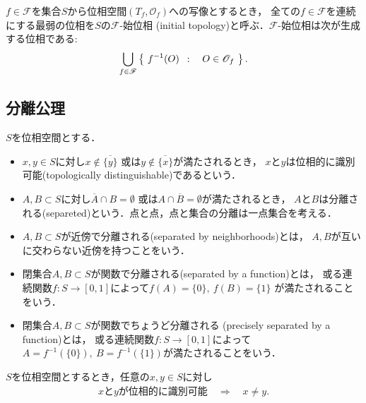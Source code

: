 	\begin{screen}
		\begin{dfn}[始位相]
			$f \in \mathscr{F}$を集合$S$から位相空間$(T_f,\mathscr{O}_f)$への写像とするとき，
			全ての$f \in \mathscr{F}$を連続にする最弱の位相を$S$の$\mathscr{F}$-始位相
			(initial topology)と呼ぶ．$\mathscr{F}$-始位相は次が生成する位相である:
			\begin{align}
				\bigcup_{f \in \mathscr{F}} \left\{\ f^{-1}(O)\ \, : \quad O \in \mathscr{O}_f\ \right\}.
			\end{align}
		\end{dfn}
	\end{screen}
	
\subsection{分離公理}
	\begin{screen}
		\begin{dfn}[位相的に識別可能・分離]
			$S$を位相空間とする．
			\begin{itemize}
				\item $x,y \in S$に対し$x \notin \overline{\{y\}}$
					或は$y \notin \overline{\{x\}}$が満たされるとき，
					$x$と$y$は位相的に識別可能(topologically distinguishable)であるという．
				\item $A,B \subset S$に対し$\overline{A} \cap B = \emptyset$
					或は$A \cap \overline{B} = \emptyset$が満たされるとき，
					$A$と$B$は分離される(separeted)という．点と点，点と集合の分離は一点集合を考える．
				\item $A,B \subset S$が近傍で分離される(separated by neighborhoods)とは，
					$A,B$が互いに交わらない近傍を持つことをいう．
				\item 閉集合$A,B \subset S$が関数で分離される(separated by a function)とは，
					或る連続関数$f:S \longrightarrow [0,1]$によって$f(A) = \{0\},\ f(B) = \{1\}$
					が満たされることをいう．
				\item 閉集合$A,B \subset S$が関数でちょうど分離される
					(precisely separated by a function)とは，
					或る連続関数$f:S \longrightarrow [0,1]$によって
					$A = f^{-1}(\{0\}),\ B = f^{-1}(\{1\})$が満たされることをいう．
			\end{itemize}
		\end{dfn}
	\end{screen}
	
	\begin{screen}
		\begin{thm}[位相的に識別可能な二点は相異なる]
			$S$を位相空間とするとき，任意の$x,y \in S$に対し
			\begin{align}
				\mbox{$x$と$y$が位相的に識別可能} \quad \Longrightarrow \quad
				x \neq y .
			\end{align}
		\end{thm}
	\end{screen}
	

